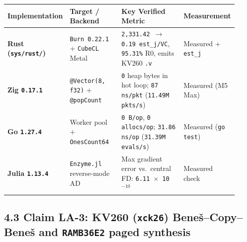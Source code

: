 \documentclass[10pt]{article}
\begin{document}
{\footnotesize\setlength{\tabcolsep}{4pt}
\begin{longtable}{@{}L{0.19\linewidth}L{0.24\linewidth}L{0.33\linewidth}L{0.16\linewidth}@{}}
\toprule
\textbf{Implementation} & \textbf{Target / Backend} & \textbf{Key Verified Metric} & \textbf{Measurement} \\
\midrule
\endhead
\textbf{Rust (\texttt{sys/rust/})} & \texttt{Burn 0.22.1} + \texttt{CubeCL} Metal & \texttt{2,331.42 $\to$ 0.19 est\_j/VC}, \texttt{95.31\%} R0, emits KV260 \texttt{.v} & Measured + \texttt{est\_j} \\
\textbf{Zig \texttt{0.17.1}} & \texttt{@Vector(8, f32)} + \texttt{@popCount} & \texttt{0} heap bytes in hot loop; \texttt{87 ns/pkt} (\texttt{11.49M pkts/s}) & Measured (M5 Max) \\
\textbf{Go \texttt{1.27.4}} & Worker pool + \texttt{OnesCount64} & \texttt{0 B/op}, \texttt{0 allocs/op}; \texttt{31.86 ns/op} (\texttt{31.39M evals/s}) & Measured (\texttt{go test}) \\
\textbf{Julia \texttt{1.13.4}} & \texttt{Enzyme.jl} reverse-mode AD & Max gradient error vs.\ central FD: \texttt{6.11 $\times$ 10$^{-10}$} & Measured check \\
\bottomrule
\end{longtable}
}

\subsection{4.3 Claim LA-3: KV260 (\texttt{xck26}) Bene\v{s}--Copy--Bene\v{s} and \texttt{RAMB36E2} paged synthesis}\label{claim-la3}
\end{document}

